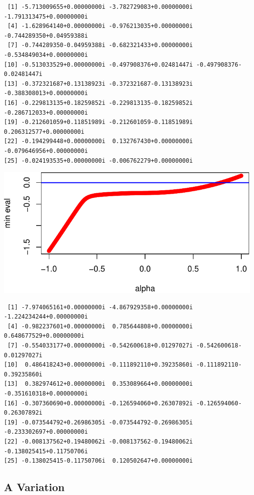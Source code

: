 \documentclass[
  12pt,
  letterpaper,
  DIV=11,
  numbers=noendperiod]{scrreprt}
\theoremstyle{remark}
\begin{document}
\begin{verbatim}
 [1] -5.713009655+0.00000000i -3.782729083+0.00000000i -1.791313475+0.00000000i
 [4] -1.628964140+0.00000000i -0.976213035+0.00000000i -0.744289350+0.04959388i
 [7] -0.744289350-0.04959388i -0.682321433+0.00000000i -0.534849034+0.00000000i
[10] -0.513033529+0.00000000i -0.497908376+0.02481447i -0.497908376-0.02481447i
[13] -0.372321687+0.13138923i -0.372321687-0.13138923i -0.388308013+0.00000000i
[16] -0.229813135+0.18259852i -0.229813135-0.18259852i -0.286712033+0.00000000i
[19] -0.212601059+0.11851989i -0.212601059-0.11851989i  0.206312577+0.00000000i
[22] -0.194299448+0.00000000i  0.132767430+0.00000000i -0.079646956+0.00000000i
[25] -0.024193535+0.00000000i -0.006762279+0.00000000i
\end{verbatim}

\includegraphics{interval_files/figure-pdf/ekk3add-1.pdf}

\begin{verbatim}
 [1] -7.974065161+0.00000000i -4.867929358+0.00000000i -1.224234244+0.00000000i
 [4] -0.982237601+0.00000000i  0.785644808+0.00000000i  0.648677529+0.00000000i
 [7] -0.554033177+0.00000000i -0.542600618+0.01297027i -0.542600618-0.01297027i
[10]  0.486418243+0.00000000i -0.111892110+0.39235860i -0.111892110-0.39235860i
[13]  0.382974612+0.00000000i  0.353089664+0.00000000i -0.351610318+0.00000000i
[16] -0.307360690+0.00000000i -0.126594060+0.26307892i -0.126594060-0.26307892i
[19] -0.073544792+0.26986305i -0.073544792-0.26986305i -0.233302697+0.00000000i
[22] -0.008137562+0.19480062i -0.008137562-0.19480062i -0.138025415+0.11750706i
[25] -0.138025415-0.11750706i  0.120502647+0.00000000i
\end{verbatim}

\subsection{A Variation}\label{variation}
\end{document}
